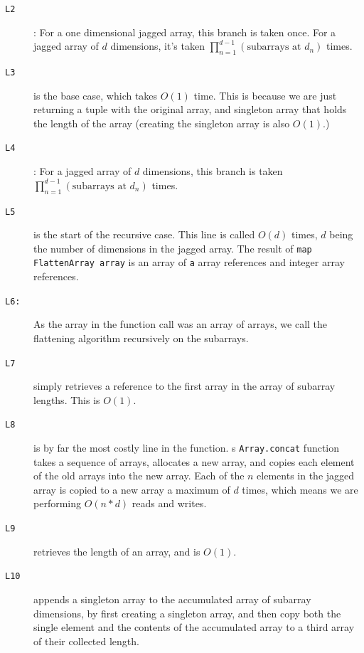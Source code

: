 \begin{description}
\item[\texttt{L2}]: For a one dimensional jagged array, this branch is taken once.
  For a jagged array of $d$ dimensions, it's taken
  $\prod_{n=1}^{d-1}(\text{subarrays at }d_n)$ times.

\item[\texttt{L3}] is the base case, which takes $O(1)$ time. This is because we
are just returning a tuple with the original array, and singleton array that holds the length of the
array (creating the singleton array is also $O(1).$)

\item[\texttt{L4}]:
  For a jagged array of $d$ dimensions, this branch is taken
  $\prod_{n=1}^{d-1}(\text{subarrays at }d_n)$ times.

\item[\texttt{L5}] is the start of the recursive case. This line is called
  $O(d)$ times, $d$ being the number of dimensions in the jagged array.
  The result of \texttt{map FlattenArray array} is an array of \texttt{a} array references
  and integer array references.

\item[\texttt{L6:}] As the array in the function call was an array of arrays, we
  call the flattening algorithm recursively on the subarrays.

\item[\texttt{L7}] simply retrieves a reference to the first array in the array
  of subarray lengths. This is $O(1)$.
\item[\texttt{L8}] is by far the most costly line in the function.
  \fsharp{}s \texttt{Array.concat} function takes a sequence of arrays,
  allocates a new array, and copies each element of the old arrays into the new array.
  Each of the $n$ elements in the jagged array is copied to a new array a maximum of $d$
  times, which means we are performing $O(n*d)$ reads and writes.
  
\item[\texttt{L9}] retrieves the length of an array, and is $O(1)$.

\item[\texttt{L10}] appends a singleton array to the accumulated array of
  subarray dimensions, by first creating a singleton array, and then copy both
  the single element and the contents of the accumulated array to a third array
  of their collected length.
\end{description}

